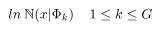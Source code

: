 \begin{equation}
\large 
ln\: \mathbb{N}(x|\Phi_{k}) \:\:\:\:\: 1\leq k \leq G
\label{eq:grt:threshold}
\end{equation}
